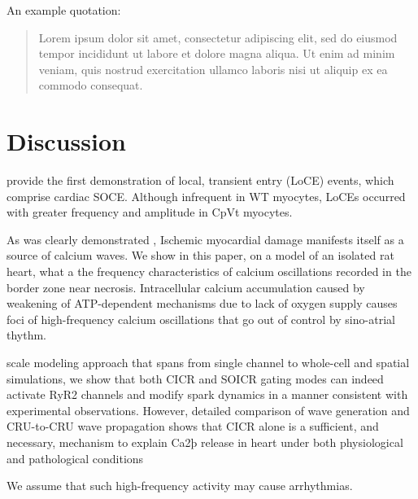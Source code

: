 \documentclass{biophys-new}
\begin{document}
An example quotation:

\begin{quote}
Lorem ipsum dolor sit amet, consectetur adipiscing elit, sed do eiusmod tempor incididunt ut labore et dolore magna aliqua. Ut enim ad minim veniam, quis nostrud exercitation ullamco laboris nisi ut aliquip ex ea commodo consequat.
\end{quote}


\section*{Discussion}

\cite{bonilla2019enhancement} provide the first demonstration of local, transient  entry
(LoCE) events, which comprise cardiac SOCE. Although infrequent in WT myocytes, LoCEs occurred
with greater frequency and amplitude in CpVt myocytes.

As was clearly demonstrated \cite{matsuura2018intravital},
Ischemic myocardial damage manifests itself as a source of calcium waves.
We show in this paper, on a model of an isolated rat heart, what a the frequency characteristics of calcium oscillations recorded in the border zone near necrosis.
Intracellular calcium accumulation caused by weakening of ATP-dependent mechanisms due to lack of oxygen supply causes foci of high-frequency calcium oscillations that go out of control by sino-atrial thythm.

scale modeling approach that spans from single channel to whole-cell and spatial
simulations, we show that both CICR and SOICR gating modes can indeed activate RyR2 channels and modify  spark dynamics in a manner consistent
with experimental observations. However, detailed comparison of  wave
generation and CRU-to-CRU  wave propagation shows that CICR alone
is a sufficient, and necessary, mechanism to explain Ca2þ release in heart under
both physiological and pathological conditions
\cite{williams2017does}

We assume that such high-frequency activity may cause arrhythmias.
\end{document}
